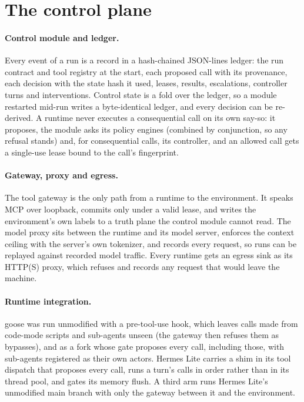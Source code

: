 \documentclass[11pt]{article}
\begin{document}
\section{The control plane}
\label{sec:system}

\paragraph{Control module and ledger.} Every event of a run is a record in a hash-chained JSON-lines ledger: the run contract and tool registry at the start, each proposed call with its provenance, each decision with the state hash it used, leases, results, escalations, controller turns and interventions. Control state is a fold over the ledger, so a module restarted mid-run writes a byte-identical ledger, and every decision can be re-derived. A runtime never executes a consequential call on its own say-so: it proposes, the module asks its policy engines (combined by conjunction, so any refusal stands) and, for consequential calls, its controller, and an allowed call gets a single-use lease bound to the call's fingerprint.

\paragraph{Gateway, proxy and egress.} The tool gateway is the only path from a runtime to the environment. It speaks MCP over loopback, commits only under a valid lease, and writes the environment's own labels to a truth plane the control module cannot read. The model proxy sits between the runtime and its model server, enforces the context ceiling with the server's own tokenizer, and records every request, so runs can be replayed against recorded model traffic. Every runtime gets an egress sink as its HTTP(S) proxy, which refuses and records any request that would leave the machine.

\paragraph{Runtime integration.} goose was run unmodified with a pre-tool-use hook, which leaves calls made from code-mode scripts and sub-agents unseen (the gateway then refuses them as bypasses), and as a fork whose gate proposes every call, including those, with sub-agents registered as their own actors. Hermes Lite carries a shim in its tool dispatch that proposes every call, runs a turn's calls in order rather than in its thread pool, and gates its memory flush. A third arm runs Hermes Lite's unmodified main branch with only the gateway between it and the environment.
\end{document}
